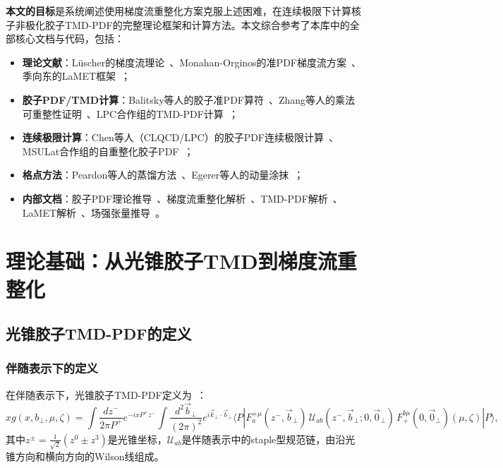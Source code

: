 \documentclass[12pt,a4paper]{ctexart}
\theoremstyle{definition}
\newcommand{\bperp}{b_\perp}
\begin{document}
\textbf{本文的目标}是系统阐述使用梯度流重整化方案克服上述困难，在连续极限下计算核子非极化胶子TMD-PDF的完整理论框架和计算方法。本文综合参考了本库中的全部核心文档与代码，包括：
\begin{itemize}
    \item \textbf{理论文献}：L\"uscher的梯度流理论~\cite{Luscher2010,LuscherWeisz2011,Luscher2013,Luscher2014}、Monahan-Orginos的准PDF梯度流方案~\cite{MonahanOrginos2017,Monahan2018}、季向东的LaMET框架~\cite{Ji:2013dva,Ji:2014gla,Ji:2017oey}；
    \item \textbf{胶子PDF/TMD计算}：Balitsky等人的胶子准PDF算符~\cite{Balitsky:2019krj,Balitsky:2021mfb}、Zhang等人的乘法可重整性证明~\cite{Zhang:2018diw}、LPC合作组的TMD-PDF计算~\cite{He2024unpolTMD,Ma2025BoerMulders,Zhang2022renormTMD}；
    \item \textbf{连续极限计算}：Chen等人（CLQCD/LPC）的胶子PDF连续极限计算~\cite{Chen2025gluon}、MSULat合作组的自重整化胶子PDF~\cite{NieMiera2025}；
    \item \textbf{格点方法}：Peardon等人的蒸馏方法~\cite{Peardon:2009gh}、Egerer等人的动量涂抹~\cite{Egerer:2020xma}；
    \item \textbf{内部文档}：胶子PDF理论推导~\cite{NoteGluonPDFs}、梯度流重整化解析~\cite{GFnote}、TMD-PDF解析~\cite{TMDnote}、LaMET解析~\cite{LaMETnote}、场强张量推导~\cite{Fmununote}。
\end{itemize}


\section{理论基础：从光锥胶子TMD到梯度流重整化}

\subsection{光锥胶子TMD-PDF的定义}

\subsubsection{伴随表示下的定义}

在伴随表示下，光锥胶子TMD-PDF定义为~\cite{Balitsky:2019krj,Chen2025gluon}：
\begin{equation}\label{eq:lightcone_tmd}
    x g(x, \bperp, \mu, \zeta) = \int \frac{dz^-}{2\pi P^+} e^{-ixP^+z^-} \int \frac{d^2\vec{b}_\perp}{(2\pi)^2} e^{i\vec{k}_\perp\cdot\vec{b}_\perp} \langle P | F^{+\mu}_a(z^-, \vec{b}_\perp) \, \mathcal{U}_{ab}(z^-, \vec{b}_\perp; 0, \vec{0}_\perp) \, F^{b\mu}_{+}(0, \vec{0}_\perp)(\mu, \zeta) | P \rangle,
\end{equation}
其中$z^\pm = \frac{1}{\sqrt{2}}(z^0 \pm z^3)$是光锥坐标，$\mathcal{U}_{ab}$是伴随表示中的staple型规范链，由沿光锥方向和横向方向的Wilson线组成。
\end{document}
